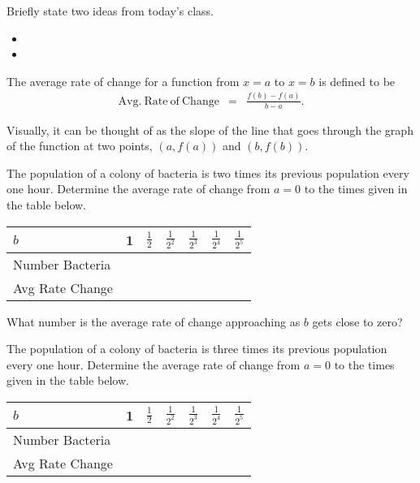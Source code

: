 \begin{problem}
\item Briefly state two ideas from today's class.
  \begin{itemize}
  \item 
  \item 
  \end{itemize}
\item The average rate of change for a function from $x=a$ to $x=b$ is
  defined to be 
  \begin{eqnarray*}
    \mathrm{Avg.~Rate~of~Change} & = & \frac{f(b)-f(a)}{b-a}.
  \end{eqnarray*}
  \scalebox{0.65}{}

  Visually, it can be thought of as the slope of the line that goes
  through the graph of the function at two points, $(a,f(a))$ and
  $(b,f(b))$.

  \begin{subproblem}
  \item The population of a colony of bacteria is two times its
    previous population every one hour. Determine the average rate of
    change from $a=0$ to the times
    given in the table below. \\
    \begin{tabular}{p{4em}|p{3em}|p{3em}|p{3em}|p{3em}|p{3em}|p{3em}}
      $b$ & 1 & $\frac{1}{2}$ & $\frac{1}{2^2}$ & $\frac{1}{2^3}$ &
      $\frac{1}{2^4}$ & $\frac{1}{2^5}$ \\ \hline
      Number Bacteria &&&&&  \\ [12pt] \hline 
      Avg Rate Change &&&&& 
    \end{tabular}

    What number is the average rate of change approaching as $b$ gets
    close to zero?

  \item The population of a colony of bacteria is three times its
    previous population every one hour. Determine the average rate of
    change from $a=0$ to the times
    given in the table below. \\
    \begin{tabular}{p{4em}|p{3em}|p{3em}|p{3em}|p{3em}|p{3em}|p{3em}}
      $b$ & 1 & $\frac{1}{2}$ & $\frac{1}{2^2}$ & $\frac{1}{2^3}$ &
      $\frac{1}{2^4}$ & $\frac{1}{2^5}$ \\ \hline
      Number Bacteria &&&&&  \\ [12pt] \hline
      Avg Rate Change &&&&& 
    \end{tabular}


\end{subproblem}
\end{problem}
